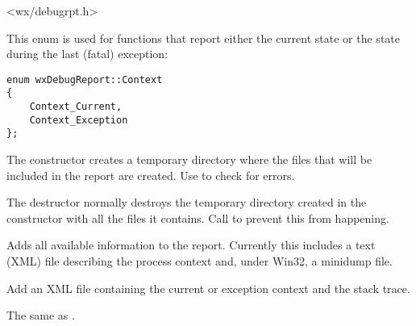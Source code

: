 <wx/debugrpt.h>


This enum is used for functions that report either the current state
or the state during the last (fatal) exception:

\begin{verbatim}
enum wxDebugReport::Context
{
    Context_Current,
    Context_Exception
};
\end{verbatim}



\label{wxdebugreportwxdebugreport}


The constructor creates a temporary directory where the files that will
be included in the report are created. Use 
 to check for errors.


\label{wxdebugreportdtor}


The destructor normally destroys the temporary directory created in the constructor
with all the files it contains. Call  to
prevent this from happening.


\label{wxdebugreportaddall}


Adds all available information to the report. Currently this includes a
text (XML) file describing the process context and, under Win32, a minidump
file.


\label{wxdebugreportaddcontext}


Add an XML file containing the current or exception context and the
stack trace.


\label{wxdebugreportaddcurrentcontext}


The same as .


\label{wxdebugreportaddcurrentdump}

